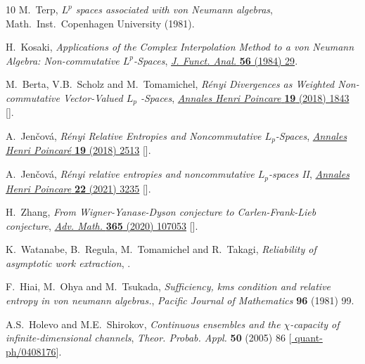 \documentclass[12pt]{article}
\numberwithin{equation}{section}
\theoremstyle{definition}
\theoremstyle{remark}
\newcommand{\?}{\overset{?}{=}}
\begin{document}
\begin{thebibliography}{10}
M.~Terp, \emph{{$L^p$} spaces associated with von Neumann algebras},
  Math.~Inst.~Copenhagen University (1981).

H.~Kosaki, \emph{{Applications of the Complex Interpolation Method to a von
  Neumann Algebra: Non-commutative $L^p$-Spaces}},
  \href{https://doi.org/10.1016/0022-1236(84)90025-9}{\emph{J. Funct. Anal.}
  {\bfseries 56} (1984) 29}.

M.~Berta, V.B.~Scholz and M.~Tomamichel, \emph{{R\'enyi Divergences as Weighted
  Non-commutative Vector-Valued $L_p$ -Spaces}},
  \href{https://doi.org/10.1007/s00023-018-0670-x}{\emph{Annales Henri
  Poincare} {\bfseries 19} (2018) 1843}
  [\href{https://arxiv.org/abs/1608.05317}{{}}].

A.~Jen{\v{c}}ov{\'a}, \emph{{R{\'e}nyi Relative Entropies and Noncommutative
  $L_p$-Spaces}},
  \href{https://doi.org/10.1007/s00023-018-0683-5}{\emph{Annales Henri
  Poincar{\'e}} {\bfseries 19} (2018) 2513}
  [\href{https://arxiv.org/abs/1609.08462}{{}}].

A.~Jen\v{c}ov\'a, \emph{{R\'enyi relative entropies and noncommutative
  $L_p$-spaces II}},
  \href{https://doi.org/10.1007/s00023-021-01074-9}{\emph{Annales Henri
  Poincare} {\bfseries 22} (2021) 3235}
  [\href{https://arxiv.org/abs/1707.00047}{{}}].

H.~Zhang, \emph{{From Wigner-Yanase-Dyson conjecture to Carlen-Frank-Lieb
  conjecture}}, \href{https://doi.org/10.1016/j.aim.2020.107053}{\emph{Adv.
  Math.} {\bfseries 365} (2020) 107053}
  [\href{https://arxiv.org/abs/1811.01205}{{}}].

K.~Watanabe, B.~Regula, M.~Tomamichel and R.~Takagi, \emph{{Reliability of
  asymptotic work extraction}},
  \href{https://arxiv.org/abs/2606.06318}{{}}.

F.~Hiai, M.~Ohya and M.~Tsukada, \emph{Sufficiency, kms condition and relative
  entropy in von neumann algebras.}, {\emph{Pacific Journal of Mathematics}
  {\bfseries 96} (1981) 99}.

A.S.~Holevo and M.E.~Shirokov, \emph{{Continuous ensembles and the
  $\chi$-capacity of infinite-dimensional channels}}, {\emph{Theor. Probab.
  Appl.} {\bfseries 50} (2005) 86}
  [\href{https://arxiv.org/abs/quant-ph/0408176}{{\ttfamily
  quant-ph/0408176}}].


\end{thebibliography}
\end{document}
